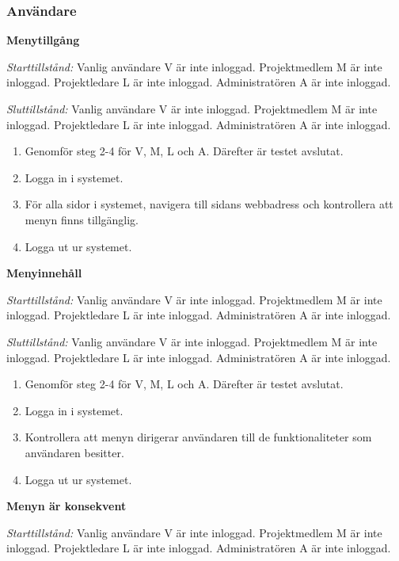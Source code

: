 \documentclass[a4paper]{article}
\begin{document}
\subsubsection{Användare}
\begin{FT}
\item \textbf{Menytillgång}

\emph{Starttillstånd:} Vanlig användare V är inte inloggad. Projektmedlem M är inte inloggad. Projektledare L är inte inloggad. Administratören A är inte inloggad.

\emph{Sluttillstånd:} Vanlig användare V är inte inloggad. Projektmedlem M är inte inloggad. Projektledare L är inte inloggad. Administratören A är inte inloggad.

\begin{enumerate}
\item Genomför steg 2-4 för V, M, L och A. Därefter är testet avslutat.
\item Logga in i systemet.
\item För alla sidor i systemet, navigera till sidans webbadress och kontrollera att menyn finns tillgänglig.
\item Logga ut ur systemet.
\end{enumerate}

\item \textbf{Menyinnehåll}

\emph{Starttillstånd:} Vanlig användare V är inte inloggad. Projektmedlem M är inte inloggad. Projektledare L är inte inloggad. Administratören A är inte inloggad.

\emph{Sluttillstånd:} Vanlig användare V är inte inloggad. Projektmedlem M är inte inloggad. Projektledare L är inte inloggad. Administratören A är inte inloggad.

\begin{enumerate}
\item Genomför steg 2-4 för V, M, L och A. Därefter är testet avslutat.
\item Logga in i systemet.
\item Kontrollera att menyn dirigerar användaren till de funktionaliteter som användaren besitter.
\item Logga ut ur systemet.
\end{enumerate}

\item \textbf{Menyn är konsekvent}

\emph{Starttillstånd:} Vanlig användare V är inte inloggad. Projektmedlem M är inte inloggad. Projektledare L är inte inloggad. Administratören A är inte inloggad.


\end{FT}
\end{document}
